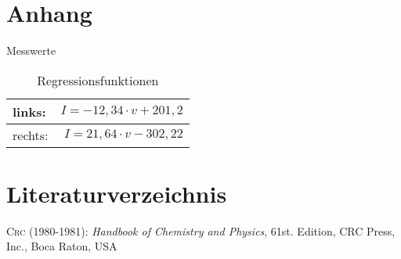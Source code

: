 \documentclass[11pt,titlepage]{scrartcl}		%
\begin{document}
\section{Anhang}
%
\begin{table}[h]
	\centering
	\caption{Messwerte}
	\label{tab:messwerte}
\end{table}
%
\begin{table}[h]
\centering
\begin{tabular}{lr}
	\toprule
	links: & $I = -12,34 \cdot v + 201,2$ \\
	\midrule
	rechts: & $I = 21,64 \cdot v -302,22$  \\
	\bottomrule
\end{tabular}
\caption{Regressionsfunktionen}
\label{tab:linfit}
\end{table}
%
\section{Literaturverzeichnis}
%
\textsc{Crc (1980-1981)}: \textit{Handbook of Chemistry and Physics}, 61st. Edition, CRC Press, Inc., Boca Raton, USA
%
\end{document}
